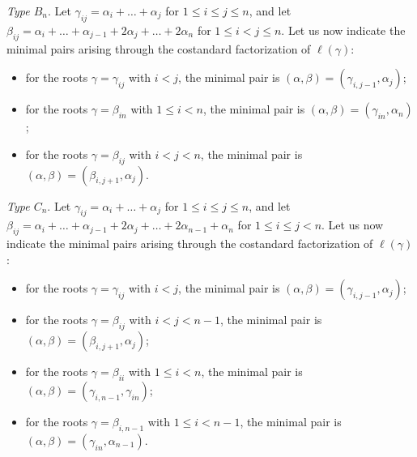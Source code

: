 \documentclass[10pt,a4paper]{amsart}
\numberwithin{equation}{section}
\begin{document}
\emph{Type $B_n$}.
Let $\gamma_{ij} = \alpha_{i} + \dots + \alpha_{j}$ for $1 \le i \le j \le n$, and let $\beta_{ij} = \alpha_{i} + \dots + \alpha_{j-1} + 2\alpha_{j} + \dots + 2\alpha_{n}$ for $1 \le i < j \le n$. Let us now indicate the minimal pairs arising through the costandard factorization of $\ell(\gamma)$:
\begin{itemize}\itemsep=0pt
\item
for the roots $\gamma=\gamma_{ij}$ with $i < j$, the minimal pair is $(\alpha,\beta)=(\gamma_{i,j - 1},\alpha_{j})$;

\item
for the roots $\gamma=\beta_{in}$ with $1\leq i<n$, the minimal pair is $(\alpha,\beta)=(\gamma_{in},\alpha_{n})$;

\item
for the roots $\gamma=\beta_{ij}$ with $i < j < n$, the minimal pair is $(\alpha,\beta)=(\beta_{i,j + 1},\alpha_{j})$.
\end{itemize}


\emph{Type $C_n$}.
Let $\gamma_{ij} = \alpha_{i} + \dots + \alpha_{j}$ for $1 \le i \le j \le n$, and let $\beta_{ij} = \alpha_{i} + \dots + \alpha_{j - 1} + 2\alpha_{j} + \dots + 2\alpha_{n-1} + \alpha_{n}$ for $1 \le i \le j<n$. Let us now indicate the minimal pairs arising through the costandard factorization of $\ell(\gamma)$:
\begin{itemize}\itemsep=0pt
\item
for the roots $\gamma=\gamma_{ij}$ with $i<j$, the minimal pair is $(\alpha,\beta)=(\gamma_{i,j - 1},\alpha_{j})$;

\item
for the roots $\gamma=\beta_{ij}$ with $i<j<n-1$, the minimal pair is $(\alpha,\beta)=(\beta_{i,j + 1},\alpha_{j})$;

\item
for the roots $\gamma=\beta_{ii}$ with $1\leq i<n$, the minimal pair is $(\alpha,\beta)=(\gamma_{i,n - 1},\gamma_{in})$;

\item for the roots $\gamma=\beta_{i,n-1}$ with $1\leq i<n-1$, the minimal pair is $(\alpha,\beta)=(\gamma_{in},\alpha_{n-1})$.

\end{itemize}
\end{document}
